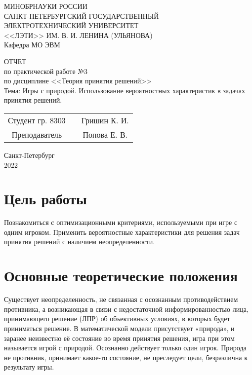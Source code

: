 \documentclass[14pt,a4paper]{extarticle}%
\begin{document}
\begin{titlepage}
  \begin{center}
    МИНОБРНАУКИ РОССИИ\\
    САНКТ-ПЕТЕРБУРГСКИЙ ГОСУДАРСТВЕННЫЙ\\
    ЭЛЕКТРОТЕХНИЧЕСКИЙ УНИВЕРСИТЕТ\\
    <<ЛЭТИ>> ИМ. В. И. ЛЕНИНА (УЛЬЯНОВА)\\
    Кафедра МО ЭВМ

    \vspace{4cm}

    ОТЧЕТ\\
    по практической работе №3\\
    по дисциплине <<Теория принятия решений>>\\
    Тема: Игры с природой. Использование вероятностных характеристик в задачах принятия решений.
    \vfill

    \begin{tabular}{ c c c }
      Студент гр. 8303 & \uline{\hspace{3cm}} & Гришин К. И. \\[1cm]
      Преподаватель    & \uline{\hspace{3cm}} & Попова Е. В. \\
    \end{tabular}
    
    \vfill
    Санкт-Петербург\\
    2022
  \end{center}
\end{titlepage}


\section{Цель работы}
Познакомиться с оптимизационными критериями, используемыми при игре
с одним игроком. Применить вероятностные характеристики для решения
задач принятия решений с наличием неопределенности.

\section{Основные теоретические положения}
Существует неопределенность, не связанная с осознанным противодействием
противника, а возникающая в связи с недостаточной информированностью лица,
принимающего решение (ЛПР) об объективных условиях, в которых будет
приниматься решение. В математической модели присутствует «природа»,
и заранее неизвестно её состояние во время принятия решения, игра при
этом называется игрой с природой. Осознанно действует только один игрок.
Природа не противник, принимает какое-то состояние, не преследует цели,
безразлична к результату игры. 
\end{document}

